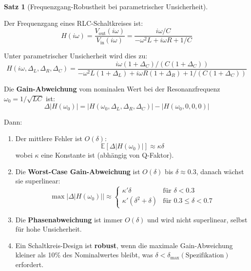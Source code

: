 \documentclass[a4paper,12pt,twoside]{report}
\theoremstyle{definition}
\newtheorem{satz}{Satz}
\begin{document}
\begin{satz}[Frequenzgang-Robustheit bei parametrischer Unsicherheit]
\label{satz:frequenzgang_unsicherheit}

Der Frequenzgang eines RLC-Schaltkreises ist:
\begin{equation}
H(i\omega) = \frac{V_{\text{out}}(i\omega)}{V_{\text{in}}(i\omega)} = \frac{i\omega/C}{-\omega^2 L + i\omega R + 1/C}
\end{equation}

Unter parametrischer Unsicherheit wird dies zu:
\begin{equation}
H(i\omega, \Delta_L, \Delta_R, \Delta_C) = \frac{i\omega(1+\Delta_C)/(C(1+\Delta_C))}{-\omega^2 L(1+\Delta_L) + i\omega R(1+\Delta_R) + 1/(C(1+\Delta_C))}
\end{equation}

Die \textbf{Gain-Abweichung} vom nominalen Wert bei der Resonanzfrequenz $\omega_0 = 1/\sqrt{LC}$ ist:
\begin{equation}
\Delta |H(\omega_0)| = |H(\omega_0, \Delta_L, \Delta_R, \Delta_C)| - |H(\omega_0, 0, 0, 0)|
\end{equation}

Dann:

\begin{enumerate}
    \item Der mittlere Fehler ist $O(\delta)$:
    \begin{equation}
    \mathbb{E}[\Delta |H(\omega_0)|] \approx \kappa \delta
    \end{equation}
    wobei $\kappa$ eine Konstante ist (abhängig von Q-Faktor).
    
    \item Die \textbf{Worst-Case Gain-Abweichung} ist $O(\delta)$ bis $\delta \approx 0.3$, danach wächst sie superlinear:
    \begin{equation}
    \max |\Delta |H(\omega_0)|| \approx \begin{cases}
    \kappa' \delta & \text{für } \delta < 0.3 \\
    \kappa' (\delta^2 + \delta) & \text{für } 0.3 \leq \delta < 0.7
    \end{cases}
    \end{equation}
    
    \item Die \textbf{Phasenabweichung} ist immer $O(\delta)$ und wird nicht superlinear, selbst für hohe Unsicherheit.
    
    \item Ein Schaltkreis-Design ist \textbf{robust}, wenn die maximale Gain-Abweichung kleiner als 10\% des Nominalwertes bleibt, was $\delta < \delta_{\max}(\text{Spezifikation})$ erfordert.
\end{enumerate}

\end{satz}
\end{document}
